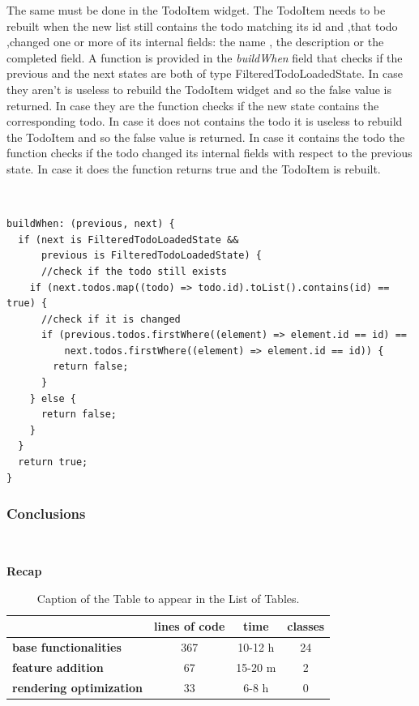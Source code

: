 The same must be done in the TodoItem widget. The TodoItem needs to be rebuilt when the new list still contains the todo matching its id and ,that todo ,changed one or more of its internal fields: the name , the description or the completed field. A function is provided in the \textit{buildWhen} field that checks if the previous and the next states are both of type FilteredTodoLoadedState. In case they aren’t is useless to rebuild the TodoItem widget and so the false value is returned. In case they are the function checks if the new state contains the corresponding todo. In case it does not contains the todo it is useless to rebuild the TodoItem and so the false value is returned. In case it contains the todo the function checks if the todo changed its internal fields with respect to the previous state. In case it does the function returns true and the  TodoItem is rebuilt.
\begin{code}
\mbox{}\\
 \mbox{}
\label{code:2.14}
\begin{verbatim}
buildWhen: (previous, next) {
  if (next is FilteredTodoLoadedState &&
      previous is FilteredTodoLoadedState) {
      //check if the todo still exists
    if (next.todos.map((todo) => todo.id).toList().contains(id) == true) {
      //check if it is changed
      if (previous.todos.firstWhere((element) => element.id == id) ==
          next.todos.firstWhere((element) => element.id == id)) {
        return false;
      }
    } else {
      return false;
    }
  }
  return true;
}
\end{verbatim}
\mbox{}
\end{code}




\subsubsection{Conclusions} \mbox{} \\
\label{subpar:render_optimizations_inherited_widget}
\begin{table}[H]
    \caption*{\textbf{Recap}}
    \centering 
    \begin{tabular}{| l | c | c | c |}
    \hline
    \rowcolor{bluepoli!40} %
    \hline
     & \textbf{lines of code} & \textbf{time} & \textbf{classes} \T\B \\
    \hline
    \textbf{base functionalities} & 367 & 10-12 h & 24 \T\B \\ 
    \textbf{feature addition} & 67 & 15-20 m & 2 \T\B\\ 
    \textbf{rendering optimization} & 33 & 6-8 h & 0
    \T\B\\
    \hline
    \end{tabular}
    \\[10pt]
    \caption{Caption of the Table to appear in the List of Tables.}
    \label{table:example}
\end{table}

